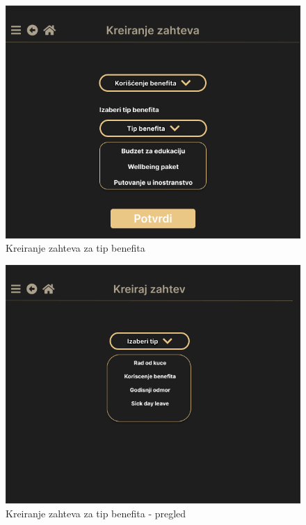 \documentclass[a4paper]{article}
\begin{document}
\begin{figure} [!ht]
    \begin{center}
        \includegraphics[scale=0.25]{UI/Zaposleni/TipBenefita.png}
    \end{center}
\caption{Kreiranje zahteva za tip benefita}
\end{figure}

\begin{figure} [!ht]
    \begin{center}
        \includegraphics[scale=0.25]{UI/Zaposleni/TipZahtevaOverview.png}
    \end{center}
\caption{Kreiranje zahteva za tip benefita - pregled}
\end{figure}
\end{document}
